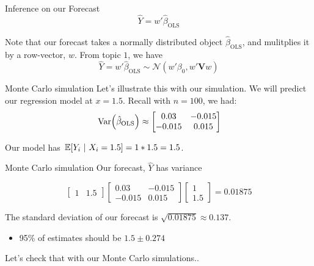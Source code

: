 \documentclass[aspectratio=169,t,11pt,table]{beamer}
\begin{document}
\begin{frame}{Inference on our Forecast}
  \vspace*{-\bigskipamount}
  $$
    \hat{Y} = w' \hat{\beta}_{\text{OLS}} 
  $$
  
  Note that our forecast takes a normally distributed object $\hat{\beta}_{\text{OLS}}$, and mulitplies it by a row-vector, $w$. From topic $1$, we have
  $$
    \hat{Y} = w' \hat{\beta}_{\text{OLS}} \sim 
    \mathcal{N}\left( w' \beta_0, w' \bm{V} w \right)
  $$
\end{frame}

\begin{frame}{Monte Carlo simulation}
  Let's illustrate this with our simulation. We will predict our regression model at $x = 1.5$. Recall with $n = 100$, we had:
  $$
    \var{\hat{\beta}_{\text{OLS}}} \approx
    \begin{bmatrix}
      0.03 & -0.015 \\
      -0.015 & 0.015
    \end{bmatrix}
  $$

  \bigskip
  Our model has $\expec{Y_i}{X_i = 1.5} = 1 * 1.5 = 1.5$. 
\end{frame}

\begin{frame}{Monte Carlo simulation}
  Our forecast, $\hat{Y}$ has variance

  $$
    \begin{bmatrix}1 & 1.5\end{bmatrix}
    \begin{bmatrix}
      0.03 & -0.015 \\
      -0.015 & 0.015
    \end{bmatrix}
    \begin{bmatrix}1 \\ 1.5\end{bmatrix}
    = 0.01875
  $$

  \bigskip
  The standard deviation of our forecast is $\sqrt{0.01875} \approx 0.137$.
  \begin{itemize}
    \item 95\% of estimates should be $1.5 \pm 0.274$
  \end{itemize}

  \bigskip
  Let's check that with our Monte Carlo simulations..
\end{frame}

\end{document}
